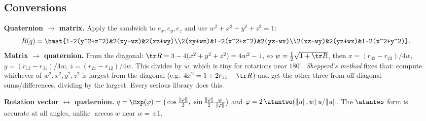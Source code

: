 \subsection{Conversions}\label{sec:rot:conversions}
\textbf{Quaternion $\to$ matrix.} Apply the sandwich to $e_x,e_y,e_z$ and use $w^2+x^2+y^2+z^2=1$:
\[
R(q)=\bmat{1-2(y^2+z^2)&2(xy-wz)&2(xz+wy)\\2(xy+wz)&1-2(x^2+z^2)&2(yz-wx)\\2(xz-wy)&2(yz+wx)&1-2(x^2+y^2)}.
\]
\textbf{Matrix $\to$ quaternion.} From the diagonal: $\tr R=3-4(x^2+y^2+z^2)=4w^2-1$, so $w=\frac12\sqrt{1+\tr R}$, then $x=(r_{32}-r_{23})/4w$, $y=(r_{13}-r_{31})/4w$, $z=(r_{21}-r_{12})/4w$. This divides by $w$, which is tiny for rotations near $180^\circ$. \emph{Shepperd's method} fixes that: compute whichever of $w^2,x^2,y^2,z^2$ is largest from the diagonal (e.g.\ $4x^2=1+2r_{11}-\tr R$) and get the other three from off-diagonal sums/differences, dividing by the largest. Every serious library does this.

\textbf{Rotation vector $\leftrightarrow$ quaternion.} $q=\Exp(\varphi)=\big(\cos\frac{\|\varphi\|}2,\ \sin\frac{\|\varphi\|}2\frac{\varphi}{\|\varphi\|}\big)$ and $\varphi=2\,\atantwo(\|u\|,w)\,u/\|u\|$. The $\atantwo$ form is accurate at all angles, unlike $\arccos w$ near $w=\pm1$.
